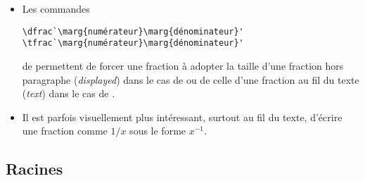 \begin{itemize}
\item Les commandes
\begin{lstlisting}
\dfrac`\marg{numérateur}\marg{dénominateur}'
\tfrac`\marg{numérateur}\marg{dénominateur}'
\end{lstlisting}
  de  permettent de forcer une fraction à adopter la
  taille d'une fraction hors paragraphe (\emph{displayed}) dans le cas
  de \cmd{\dfrac} ou de celle d'une fraction au fil du texte
  (\emph{text}) dans le cas de \cmd{\tfrac}.
\item Il est parfois visuellement plus intéressant, surtout au fil du
  texte, d'écrire une fraction comme $1/x$ sous le forme $x^{-1}$.
\end{itemize}

\subsection{Racines}
\label{sec:math:bases:racines}

